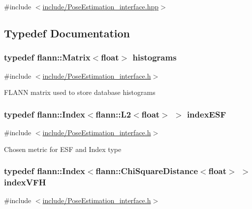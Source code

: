 {\ttfamily \#include $<$\hyperlink{PoseEstimation__interface_8hpp}{include/\-Pose\-Estimation\-\_\-interface.\-hpp}$>$}



\subsection{Typedef Documentation}
\hypertarget{group__Typedefs_ga136493056b2eaf642f660e6a45a62991}{
\subsubsection[{histograms}]{\setlength{\rightskip}{0pt plus 5cm}typedef flann\-::\-Matrix$<$float$>$ {\bf histograms}}}\label{group__Typedefs_ga136493056b2eaf642f660e6a45a62991}


{\ttfamily \#include $<$\hyperlink{PoseEstimation__interface_8h}{include/\-Pose\-Estimation\-\_\-interface.\-h}$>$}

F\-L\-A\-N\-N matrix used to store database histograms \hypertarget{group__Typedefs_ga3f45d3216269cf676ea864ae3bfcc446}{
\subsubsection[{index\-E\-S\-F}]{\setlength{\rightskip}{0pt plus 5cm}typedef flann\-::\-Index$<$flann\-::\-L2$<$float$>$ $>$ {\bf index\-E\-S\-F}}}\label{group__Typedefs_ga3f45d3216269cf676ea864ae3bfcc446}


{\ttfamily \#include $<$\hyperlink{PoseEstimation__interface_8h}{include/\-Pose\-Estimation\-\_\-interface.\-h}$>$}

Chosen metric for E\-S\-F and Index type \hypertarget{group__Typedefs_gacea1a4bf0f6b886a58ff00ff9cb54b34}{
\subsubsection[{index\-V\-F\-H}]{\setlength{\rightskip}{0pt plus 5cm}typedef flann\-::\-Index$<$flann\-::\-Chi\-Square\-Distance$<$float$>$ $>$ {\bf index\-V\-F\-H}}}\label{group__Typedefs_gacea1a4bf0f6b886a58ff00ff9cb54b34}


{\ttfamily \#include $<$\hyperlink{PoseEstimation__interface_8h}{include/\-Pose\-Estimation\-\_\-interface.\-h}$>$}

